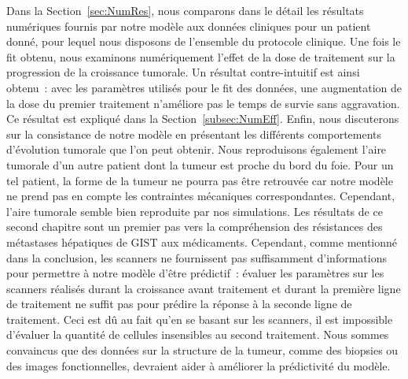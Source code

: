 \documentclass[main.tex]{subfiles}
\begin{document}

Dans la Section~\ref{sec:NumRes}, nous comparons dans le détail les résultats numériques fournis par notre modèle aux données cliniques pour un patient donné, pour lequel nous disposons de l'ensemble du protocole clinique. 
Une fois le fit obtenu, nous examinons numériquement l'effet de la dose de traitement sur la progression de la croissance tumorale. Un résultat contre-intuitif est ainsi obtenu~: avec les paramètres utilisés pour le fit des données, une augmentation de la dose du premier traitement n'améliore pas le temps de survie sans aggravation. Ce résultat est expliqué dans la Section~\ref{subsec:NumEff}. 
Enfin, nous discuterons sur la consistance de notre modèle en présentant les différents comportements d'évolution tumorale que l'on peut obtenir. 
Nous reproduisons également l'aire tumorale d'un autre patient dont la tumeur est proche du bord du foie. 
Pour un tel patient, la forme de la tumeur ne pourra pas être retrouvée car notre modèle ne prend pas en compte les contraintes mécaniques correspondantes. Cependant, l'aire tumorale semble bien reproduite par nos simulations. 
Les résultats de ce second chapitre sont un premier pas vers la compréhension des résistances des métastases hépatiques de GIST aux médicaments. Cependant, comme mentionné dans la conclusion, les scanners ne fournissent pas suffisamment d'informations pour permettre à notre modèle d'être prédictif~: évaluer les paramètres sur les scanners réalisés durant la croissance avant traitement et durant la première ligne de traitement ne suffit pas pour prédire la réponse à la seconde ligne de traitement. Ceci est dû au fait qu'en se basant sur les scanners, il est impossible d'évaluer la quantité de cellules insensibles au second traitement. Nous sommes convaincus que des données sur la structure de la tumeur, comme des biopsies ou des images fonctionnelles, devraient aider à améliorer la prédictivité du modèle.
\end{document}
